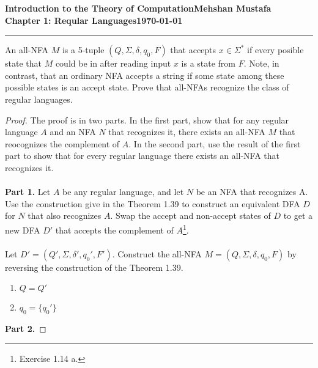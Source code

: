 \documentclass[11pt]{article}
\newcommand{\myname}{Mehshan Mustafa}
\newcommand{\dated}{\today}
\newenvironment{problem}[2][Problem]{\begin{trivlist}
\item[\hskip \labelsep {\bfseries #1}\hskip \labelsep {\bfseries #2.}]}{\end{trivlist}}
\begin{document}
\textbf{Introduction to the Theory of
Computation}\hfill\textbf{\myname}\\[0.01in]
\textbf{Chapter 1: Reqular Languages}\hfill\textbf{\dated}\\
\smallskip\hrule\bigskip

\begin{problem}{1.38}
An all-NFA $M$ is a 5-tuple $(Q, \Sigma, \delta, q_{0}, F)$ that accepts $x \in \Sigma^{*}$ if every posible state that $M$ could be in after reading input $x$ is a state from $F$. Note, in contrast, that an ordinary NFA accepts a string if some state among these possible states is an accept state. Prove that all-NFAs recognize the class of regular languages.
\end{problem}

\begin{proof}
The proof is in two parts. In the first part, show that for any regular language $A$ and an NFA $N$ that recognizes it, there exists an all-NFA $M$ that reocognizes the complement of $A$. In the second part, use the result of the first part to show that for every regular language there exists an all-NFA that recognizes it.
\\
\\
\textbf{Part 1.} Let $A$ be any regular language, and let $N$ be an NFA that recognizes A. Use the construction give in the Theorem 1.39 to construct an equivalent DFA $D$ for $N$ that also recognizes $A$. Swap the accept and non-accept states of $D$ to get a new DFA $D'$ that accepts the complement of $A$\footnote{Exercise 1.14 a.}.
\\
\\
Let $D' = (Q', \Sigma, \delta', q_{0}', F')$. Construct the all-NFA $M = (Q, \Sigma, \delta, q_{0}, F)$ by reversing the construction of the Theorem 1.39.
\begin{enumerate}
\item $Q = Q'$
\item $q_{0} = \{q_{0}'\}$
\end{enumerate}
\textbf{Part 2.}
\end{proof}
\end{document}
